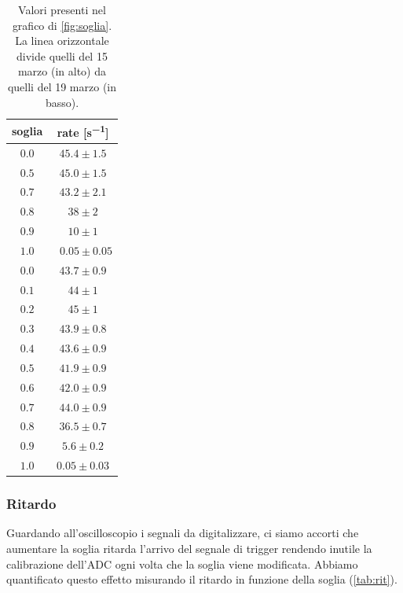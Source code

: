 \begin{table}[h]
\centering

\begin{tabular}{c|c}
soglia & rate [\si{s^{-1}}] \\
\hline
$ 0.0 $ & $ 45.4 \pm 1.5 $\\ 
$ 0.5 $ & $ 45.0 \pm 1.5 $\\ 
$ 0.7 $ & $ 43.2 \pm 2.1 $\\ 
$ 0.8 $ & $ 38 \pm 2 $\\ 
$ 0.9 $ & $ 10 \pm 1 $\\ 
$ 1.0 $ & $\;\; 0.05 \pm 0.05 $\\ 
\hline
$ 0.0 $ & $ 43.7 \pm 0.9 $\\ 
$ 0.1 $ & $ 44 \pm 1 $\\ 
$ 0.2 $ & $ 45 \pm 1 $\\ 
$ 0.3 $ & $ 43.9 \pm 0.8 $\\ 
$ 0.4 $ & $ 43.6 \pm 0.9 $\\ 
$ 0.5 $ & $ 41.9 \pm 0.9 $\\ 
$ 0.6 $ & $ 42.0 \pm 0.9 $\\ 
$ 0.7 $ & $ 44.0 \pm 0.9 $\\ 
$ 0.8 $ & $ 36.5 \pm 0.7 $\\ 
$ 0.9 $ & $ 5.6 \pm 0.2 $\\ 
$ 1.0 $ & $ 0.05 \pm 0.03 $\\ 

\end{tabular}

\caption{Valori presenti nel grafico di \autoref{fig:soglia}. La linea orizzontale divide quelli del 15 marzo (in alto) da quelli del 19 marzo (in basso).}
\label{tab:soglia}
\end{table}

\subsubsection{Ritardo}

Guardando all'oscilloscopio i segnali da digitalizzare, ci siamo accorti che aumentare la soglia ritarda l'arrivo del segnale di trigger rendendo inutile la calibrazione dell'ADC ogni volta che la soglia viene modificata. Abbiamo quantificato questo effetto misurando il ritardo in funzione della soglia (\autoref{tab:rit}). 

